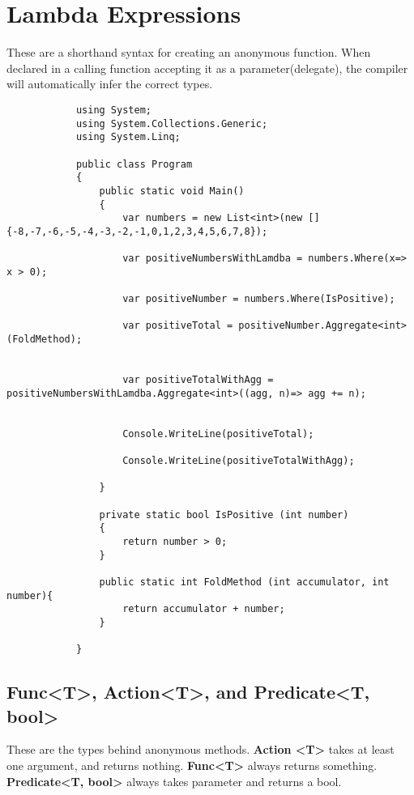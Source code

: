 \documentclass {amsart}
\begin{document}
	\section{Lambda Expressions}  These are a shorthand syntax for creating an anonymous function.  When declared in a calling function accepting it as a parameter(delegate), the compiler will automatically infer the correct types. 
		\begin{lstlisting}
			using System;
			using System.Collections.Generic;
			using System.Linq;
			
			public class Program
			{
				public static void Main()
				{
					var numbers = new List<int>(new [] {-8,-7,-6,-5,-4,-3,-2,-1,0,1,2,3,4,5,6,7,8});
			
					var positiveNumbersWithLamdba = numbers.Where(x=> x > 0);
			
					var positiveNumber = numbers.Where(IsPositive);
					
					var positiveTotal = positiveNumber.Aggregate<int>(FoldMethod);
			
			
					var positiveTotalWithAgg = positiveNumbersWithLamdba.Aggregate<int>((agg, n)=> agg += n);
			
					
					Console.WriteLine(positiveTotal);
					
					Console.WriteLine(positiveTotalWithAgg);
					
				}
			
				private static bool IsPositive (int number)
				{
					return number > 0;
				}
				
				public static int FoldMethod (int accumulator, int number){
					return accumulator + number;	
				}
				
			}
		\end{lstlisting}


	\subsection{Func\textless  T\textgreater, Action\textless  T\textgreater, and Predicate\textless  T, bool\textgreater} These are the types behind anonymous methods. 
 {\bf Action \textless  T\textgreater} \space takes at least one argument, and returns nothing. {\bf Func\textless  T\textgreater} always returns something.  {\bf Predicate\textless  T, bool\textgreater} always takes  parameter and returns a bool. 
\end{document}
